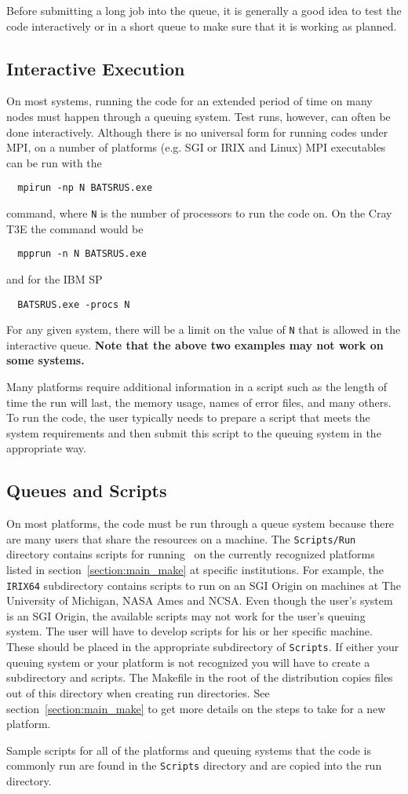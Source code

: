 Before submitting a long job into the queue, it is generally a good idea
to test the code interactively or in a short queue to make sure that
it is working as planned.

\subsection{Interactive Execution \label{section:interactive}}

On most systems, running the code for an extended period of time
on many nodes must happen through a queuing system.  Test runs, however,
can often be done interactively.
Although there is no universal form for running codes under MPI, on a 
number of platforms (e.g. SGI or IRIX and Linux) MPI executables
can be run with the 
\begin{verbatim}
  mpirun -np N BATSRUS.exe
\end{verbatim}
command, where {\tt N} is the number of processors to run the code on.  
On the Cray T3E the command would be
\begin{verbatim}
  mpprun -n N BATSRUS.exe
\end{verbatim}
and for the IBM SP
\begin{verbatim}
  BATSRUS.exe -procs N
\end{verbatim}
For any given system, there will be a limit on the value of {\tt N}
that is allowed in the interactive queue.  {\bf Note that the above two
examples may not work on some systems.}

Many platforms require additional information in a script such as the length 
of time
the run will last, the memory usage, names of error files, and many others.
To run the code, the user typically needs to prepare a script that meets the
system requirements and then submit this script to the queuing system in the 
appropriate way.

\subsection{Queues and Scripts \label{section:queues}}

On most platforms, the code must be run through a queue system because
there are many users that share the resources on a machine.  
The {\tt Scripts/Run}
directory contains scripts for running \BATSRUS\ on the currently recognized 
platforms listed in section~\ref{section:main_make} 
at specific institutions.  For example, the {\tt IRIX64} subdirectory
contains scripts to run on an SGI Origin on machines at The University of
Michigan, NASA Ames  and NCSA.  Even though the user's system is an SGI
Origin, the available scripts may not work for the user's queuing system.
The user will have to develop scripts for his or her specific machine. 
These should be placed in the appropriate subdirectory of {\tt Scripts}.
If either your queuing system or your platform is not recognized you will
have to create a subdirectory and scripts.
The Makefile in the root of the distribution copies files out of this
directory when creating run directories.  See section~\ref{section:main_make} 
to get more details on the steps to take for a new platform.

Sample scripts for all of the platforms and queuing systems that the
code is commonly run are found in the {\tt Scripts} directory
and are copied into the run directory.
